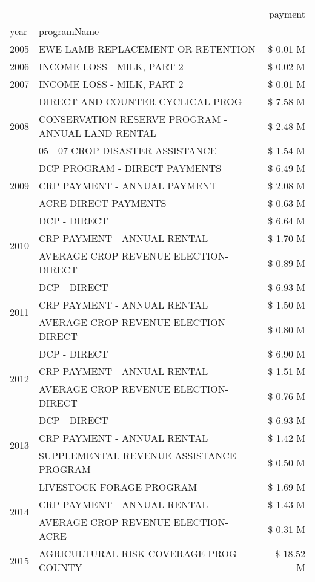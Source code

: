 \begin{tabular}{llr}
\toprule
 &  & payment \\
year & programName &  \\
\midrule
2005 & EWE LAMB REPLACEMENT OR RETENTION & \$ 0.01 M \\
\cline{1-3}
2006 & INCOME LOSS - MILK, PART 2 & \$ 0.02 M \\
\cline{1-3}
2007 & INCOME LOSS - MILK, PART 2 & \$ 0.01 M \\
\cline{1-3}
\multirow[t]{3}{*}{2008} & DIRECT AND COUNTER CYCLICAL PROG & \$ 7.58 M \\
 & CONSERVATION RESERVE PROGRAM - ANNUAL LAND RENTAL & \$ 2.48 M \\
 & 05 - 07 CROP DISASTER ASSISTANCE & \$ 1.54 M \\
\cline{1-3}
\multirow[t]{3}{*}{2009} & DCP PROGRAM - DIRECT PAYMENTS & \$ 6.49 M \\
 & CRP PAYMENT - ANNUAL PAYMENT & \$ 2.08 M \\
 & ACRE DIRECT PAYMENTS & \$ 0.63 M \\
\cline{1-3}
\multirow[t]{3}{*}{2010} & DCP - DIRECT & \$ 6.64 M \\
 & CRP PAYMENT - ANNUAL RENTAL & \$ 1.70 M \\
 & AVERAGE CROP REVENUE ELECTION-DIRECT & \$ 0.89 M \\
\cline{1-3}
\multirow[t]{3}{*}{2011} & DCP - DIRECT & \$ 6.93 M \\
 & CRP PAYMENT - ANNUAL RENTAL & \$ 1.50 M \\
 & AVERAGE CROP REVENUE ELECTION-DIRECT & \$ 0.80 M \\
\cline{1-3}
\multirow[t]{3}{*}{2012} & DCP - DIRECT & \$ 6.90 M \\
 & CRP PAYMENT - ANNUAL RENTAL & \$ 1.51 M \\
 & AVERAGE CROP REVENUE ELECTION-DIRECT & \$ 0.76 M \\
\cline{1-3}
\multirow[t]{3}{*}{2013} & DCP - DIRECT & \$ 6.93 M \\
 & CRP PAYMENT - ANNUAL RENTAL & \$ 1.42 M \\
 & SUPPLEMENTAL REVENUE ASSISTANCE PROGRAM & \$ 0.50 M \\
\cline{1-3}
\multirow[t]{3}{*}{2014} & LIVESTOCK FORAGE PROGRAM & \$ 1.69 M \\
 & CRP PAYMENT - ANNUAL RENTAL & \$ 1.43 M \\
 & AVERAGE CROP REVENUE ELECTION-ACRE & \$ 0.31 M \\
\cline{1-3}
\multirow[t]{3}{*}{2015} & AGRICULTURAL RISK COVERAGE PROG - COUNTY & \$ 18.52 M \\

\end{tabular}

